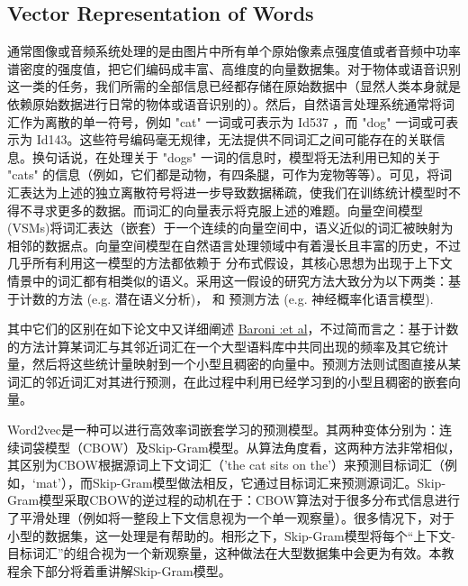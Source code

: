 \subsection{Vector Representation of Words}
通常图像或音频系统处理的是由图片中所有单个原始像素点强度值或者音频中功率谱密度的强度值，把它们编码成丰富、高维度的向量数据集。对于物体或语音识别这一类的任务，我们所需的全部信息已经都存储在原始数据中（显然人类本身就是依赖原始数据进行日常的物体或语音识别的）。然后，自然语言处理系统通常将词汇作为离散的单一符号，例如 "cat" 一词或可表示为 Id537 ，而 "dog" 一词或可表示为 Id143。这些符号编码毫无规律，无法提供不同词汇之间可能存在的关联信息。换句话说，在处理关于 "dogs" 一词的信息时，模型将无法利用已知的关于 "cats" 的信息（例如，它们都是动物，有四条腿，可作为宠物等等）。可见，将词汇表达为上述的独立离散符号将进一步导致数据稀疏，使我们在训练统计模型时不得不寻求更多的数据。而词汇的向量表示将克服上述的难题。向量空间模型 (VSMs)将词汇表达（嵌套）于一个连续的向量空间中，语义近似的词汇被映射为相邻的数据点。向量空间模型在自然语言处理领域中有着漫长且丰富的历史，不过几乎所有利用这一模型的方法都依赖于 分布式假设，其核心思想为出现于上下文情景中的词汇都有相类似的语义。采用这一假设的研究方法大致分为以下两类：基于计数的方法 (e.g. 潜在语义分析)， 和 预测方法 (e.g. 神经概率化语言模型).

其中它们的区别在如下论文中又详细阐述 \href{http://clic.cimec.unitn.it/marco/publications/acl2014/baroni-etal-countpredict-acl2014.pdf}{Baroni :et al}，不过简而言之：基于计数的方法计算某词汇与其邻近词汇在一个大型语料库中共同出现的频率及其它统计量，然后将这些统计量映射到一个小型且稠密的向量中。预测方法则试图直接从某词汇的邻近词汇对其进行预测，在此过程中利用已经学习到的小型且稠密的嵌套向量。

Word2vec是一种可以进行高效率词嵌套学习的预测模型。其两种变体分别为：连续词袋模型（CBOW）及Skip-Gram模型。从算法角度看，这两种方法非常相似，其区别为CBOW根据源词上下文词汇（'the cat sits on the'）来预测目标词汇（例如，‘mat’），而Skip-Gram模型做法相反，它通过目标词汇来预测源词汇。Skip-Gram模型采取CBOW的逆过程的动机在于：CBOW算法对于很多分布式信息进行了平滑处理（例如将一整段上下文信息视为一个单一观察量）。很多情况下，对于小型的数据集，这一处理是有帮助的。相形之下，Skip-Gram模型将每个“上下文-目标词汇”的组合视为一个新观察量，这种做法在大型数据集中会更为有效。本教程余下部分将着重讲解Skip-Gram模型。
